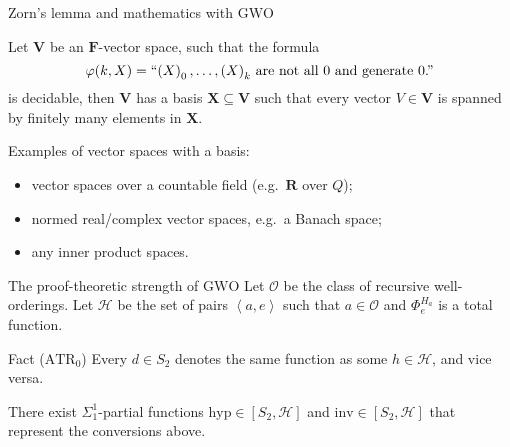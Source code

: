 \documentclass{beamer}
\newcommand{\tuple}[1]{\left\langle #1 \right\rangle}
\begin{document}
\begin{frame}{Zorn's lemma and mathematics with $\mathrm{GWO}$}
  \begin{corollary}
    Let $\mathbf{V}$ be an $\mathbf{F}$-vector space, such that the formula
    \[\varphi\mleft(k, X\mright) = \text{``$\left(X\right)_0, \ldots, \left(X\right)_k$ are not all $0$ and generate $0$.''}\]
    is decidable, then $\mathbf{V}$ has a basis $\mathbf{X} \subseteq \mathbf{V}$ such that every vector $V \in \mathbf{V}$ is spanned by finitely many elements in $\mathbf{X}$.
  \end{corollary}

  \vspace*{8pt}

  Examples of vector spaces with a basis:
  \begin{itemize}
    \item vector spaces over a countable field (e.g.\ $\mathbf{R}$ over $Q$);
    \item normed real/complex vector spaces, e.g.\ a Banach space;
    \item any inner product spaces.
  \end{itemize}
\end{frame}

\begin{frame}{The proof-theoretic strength of $\mathrm{GWO}$}
  Let $\mathcal{O}$ be the class of recursive well-orderings. Let $\mathcal{H}$ be the set of pairs $\tuple{a, e}$ such that $a \in \mathcal{O}$ and $\Phi^{H_a}_e$ is a total function.

  \vspace*{8pt}

  \begin{block}{Fact ($\mathrm{ATR}_0$)}
    Every $d \in S_2$ denotes the same function as some $h \in \mathcal{H}$, and vice versa.
  \end{block}

  \vspace*{8pt}

  \begin{theorem}
    There exist $\Sigma^1_1$-partial functions $\mathrm{hyp} \in \left[S_2, \mathcal{H}\right]$ and $\mathrm{inv} \in \left[S_2, \mathcal{H}\right]$ that represent the conversions above.
  \end{theorem}

  \nocite{simpson09-soa}
\end{frame}
\end{document}
